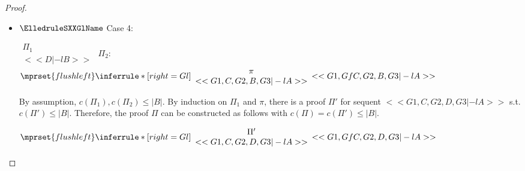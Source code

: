 \begin{proof}
\begin{enumerate}
\begin{itemize}
  \item $\ElledruleSXXGlName$ Case 4:
    \begin{center}
      \scriptsize
      \begin{math}
        \begin{array}{c}
          \Pi_1 \\
          {<<D |-l B>>}
        \end{array}
      \end{math}
      \qquad\qquad
      $\Pi_2$:
      \begin{math}
        $$\mprset{flushleft}
        \inferrule* [right={\tiny Gl}] {
          {
            \begin{array}{c}
              \pi \\
              {<<G1, C, G2, B, G3 |-l A>>}
            \end{array}
          }
        }{<<G1, Gf C, G2, B, G3 |-l A>>}
      \end{math}
    \end{center}
    By assumption, $c(\Pi_1),c(\Pi_2)\leq |B|$. By induction on $\Pi_1$ and $\pi$, there is a
    proof $\Pi'$ for sequent $<<G1, C, G2, D, G3 |-l A>>$ s.t. $c(\Pi') \leq |B|$. Therefore,
    the proof $\Pi$ can be constructed as follows with $c(\Pi) = c(\Pi') \leq |B|$.
    \begin{center}
      \scriptsize
      \begin{math}
        $$\mprset{flushleft}
        \inferrule* [right={\tiny Gl}] {
          {
            \begin{array}{c}
              \Pi' \\
              {<<G1, C, G2, D, G3 |-l A>>}
            \end{array}
          }
        }{<<G1, Gf C, G2, D, G3 |-l A>>}
      \end{math}
    \end{center}


\end{itemize}
\end{enumerate}
\end{proof}
